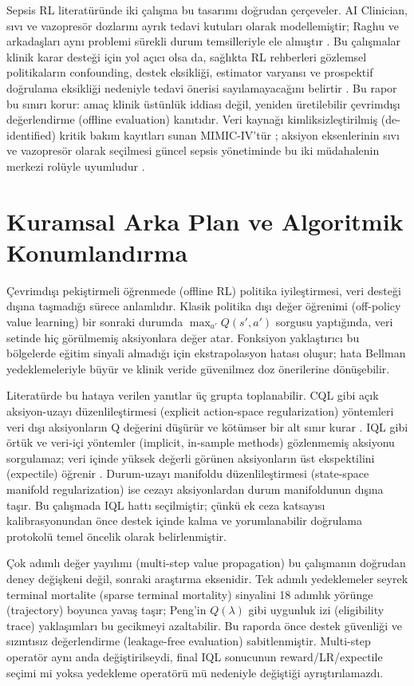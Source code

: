 \documentclass[conference]{IEEEtran}
\begin{document}
Sepsis RL literatüründe iki çalışma bu tasarımı doğrudan çerçeveler. AI Clinician, sıvı ve vazopresör dozlarını ayrık tedavi kutuları olarak modellemiştir; Raghu ve arkadaşları aynı problemi sürekli durum temsilleriyle ele almıştır \cite{komorowski2018ai,raghu2017sepsis}. Bu çalışmalar klinik karar desteği için yol açıcı olsa da, sağlıkta RL rehberleri gözlemsel politikaların confounding, destek eksikliği, estimator varyansı ve prospektif doğrulama eksikliği nedeniyle tedavi önerisi sayılamayacağını belirtir \cite{gottesman2019guidelines}. Bu rapor bu sınırı korur: amaç klinik üstünlük iddiası değil, yeniden üretilebilir çevrimdışı değerlendirme (offline evaluation) kanıtıdır. Veri kaynağı kimliksizleştirilmiş (de-identified) kritik bakım kayıtları sunan MIMIC-IV'tür \cite{mimiciv}; aksiyon eksenlerinin sıvı ve vazopresör olarak seçilmesi güncel sepsis yönetiminde bu iki müdahalenin merkezi rolüyle uyumludur \cite{evans2021ssc}.

\section{Kuramsal Arka Plan ve Algoritmik Konumlandırma}
Çevrimdışı pekiştirmeli öğrenmede (offline RL) politika iyileştirmesi, veri desteği dışına taşmadığı sürece anlamlıdır. Klasik politika dışı değer öğrenimi (off-policy value learning) bir sonraki durumda $\max_{a'} Q(s',a')$ sorgusu yaptığında, veri setinde hiç görülmemiş aksiyonlara değer atar. Fonksiyon yaklaştırıcı bu bölgelerde eğitim sinyali almadığı için ekstrapolasyon hatası oluşur; hata Bellman yedeklemeleriyle büyür ve klinik veride güvenilmez doz önerilerine dönüşebilir.

Literatürde bu hataya verilen yanıtlar üç grupta toplanabilir. CQL gibi açık aksiyon-uzayı düzenlileştirmesi (explicit action-space regularization) yöntemleri veri dışı aksiyonların Q değerini düşürür ve kötümser bir alt sınır kurar \cite{cql}. IQL gibi örtük ve veri-içi yöntemler (implicit, in-sample methods) gözlenmemiş aksiyonu sorgulamaz; veri içinde yüksek değerli görünen aksiyonların üst ekspektilini (expectile) öğrenir \cite{iql}. Durum-uzayı manifoldu düzenlileştirmesi (state-space manifold regularization) ise cezayı aksiyonlardan durum manifoldunun dışına taşır. Bu çalışmada IQL hattı seçilmiştir; çünkü ek ceza katsayısı kalibrasyonundan önce destek içinde kalma ve yorumlanabilir doğrulama protokolü temel öncelik olarak belirlenmiştir.

Çok adımlı değer yayılımı (multi-step value propagation) bu çalışmanın doğrudan deney değişkeni değil, sonraki araştırma eksenidir. Tek adımlı yedeklemeler seyrek terminal mortalite (sparse terminal mortality) sinyalini 18 adımlık yörünge (trajectory) boyunca yavaş taşır; Peng'in $Q(\lambda)$ gibi uygunluk izi (eligibility trace) yaklaşımları bu gecikmeyi azaltabilir. Bu raporda önce destek güvenliği ve sızıntısız değerlendirme (leakage-free evaluation) sabitlenmiştir. Multi-step operatör aynı anda değiştirilseydi, final IQL sonucunun reward/LR/expectile seçimi mi yoksa yedekleme operatörü mü nedeniyle değiştiği ayrıştırılamazdı.
\end{document}
